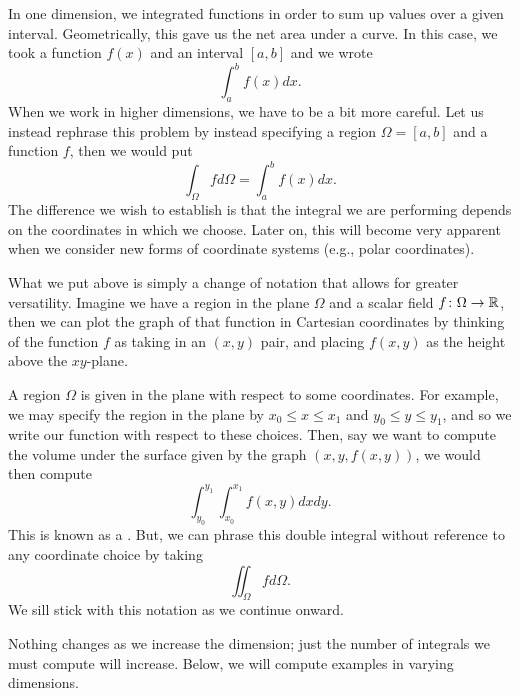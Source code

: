                 In one dimension, we integrated functions in order to sum up values over a given interval.  Geometrically, this gave us the net area under a curve.  In this case, we took a function $f(x)$ and an interval $[a,b]$ and we wrote
                \[
                \int_a^b f(x) dx.
                \]
                When we work in higher dimensions, we have to be a bit more careful.  Let us instead rephrase this problem by instead specifying a region $\Omega = [a,b]$ and a function $f$, then we would put
                \[
                \int_\Omega f d\Omega = \int_a^b f(x)dx.
                \]
                The difference we wish to establish is that the integral we are performing depends on the coordinates in which we choose.  Later on, this will become very apparent when we consider new forms of coordinate systems (e.g., polar coordinates).  
                
                What we put above is simply a change of notation that allows for greater versatility.  Imagine we have a region in the plane $\Omega$ and a scalar field $f\colon \Omega \to \mathbb{R}$, then we can plot the graph of that function in Cartesian coordinates by thinking of the function $f$ as taking in an $(x,y)$ pair, and placing $f(x,y)$ as the height above the $xy$-plane.
                \begin{figure}[H]
                	\centering
                	\def\svgwidth{0.75\columnwidth}
                	
                \end{figure}
                A region $\Omega$ is given in the plane with respect to some coordinates.  For example, we may specify the region in the plane by $x_0 \leq x \leq x_1$ and $y_0 \leq y \leq y_1$, and so we write our function with respect to these choices.  Then, say we want to compute the volume under the surface given by the graph $(x,y,f(x,y))$, we would then compute
                \[
                \int_{y_0}^{y_1} \int_{x_0}^{x_1} f(x,y)dxdy.
                \]
                This is known as a .  But, we can phrase this double integral without reference to any coordinate choice by taking
                \[
                \iint_\Omega f d\Omega.
                \]
             	We sill stick with this notation as we continue onward.
             	
             	Nothing changes as we increase the dimension; just the number of integrals we must compute will increase.  Below, we will compute examples in varying dimensions.
             	
